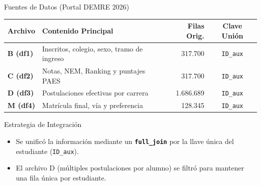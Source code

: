 \documentclass[10pt, aspectratio=169, xcolor=table]{beamer}
\begin{document}
\begin{frame}{Fuentes de Datos (Portal DEMRE 2026)}
  \begin{table}
    \centering
    \small
    \begin{tabular}{llrc}
      \toprule
      \textbf{\textcolor{USACHNavy}{Archivo}} & \textbf{\textcolor{USACHNavy}{Contenido Principal}} & \textbf{\textcolor{USACHNavy}{Filas Orig.}} & \textbf{\textcolor{USACHNavy}{Clave Unión}} \\
      \midrule
      \textbf{B (df1)} & Inscritos, colegio, sexo, tramo de ingreso & 317.700 & \texttt{ID\_aux} \\
      \textbf{C (df2)} & Notas, NEM, Ranking y puntajes PAES & 317.700 & \texttt{ID\_aux} \\
      \textbf{D (df3)} & Postulaciones efectivas por carrera & 1.686.689 & \texttt{ID\_aux} \\
      \textbf{M (df4)} & Matrícula final, vía y preferencia & 128.345 & \texttt{ID\_aux} \\
      \bottomrule
    \end{tabular}
  \end{table}

  \vspace{0.2cm}

  \begin{exampleblock}{Estrategia de Integración}
    \begin{itemize}
      \item Se unificó la información mediante un \textbf{\texttt{full\_join}} por la llave única del estudiante (\texttt{ID\_aux}).
      \item El archivo D (múltiples postulaciones por alumno) se filtró para mantener una fila única por estudiante.
    \end{itemize}
  \end{exampleblock}
\end{frame}
\end{document}
